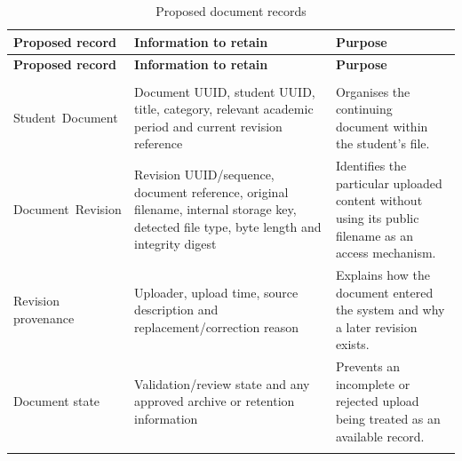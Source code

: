 \begingroup
\singlespacing%
\setlength{\tabcolsep}{4pt}
\begin{longtable}{@{}>{\RaggedRight\arraybackslash}p{}>{\RaggedRight\arraybackslash}p{}>{\RaggedRight\arraybackslash}p{}@{}}
\caption{Proposed document records}\label{tab:3-4}\\
\toprule
\textbf{Proposed record} & \textbf{Information to retain} & \textbf{Purpose} \\
\midrule
\endfirsthead%
\toprule
\textbf{Proposed record} & \textbf{Information to retain} & \textbf{Purpose} \\
\midrule
\endhead%
\midrule
\multicolumn{3}{r}{Continued on next page}\\
\endfoot%
\bottomrule
\endlastfoot%
Student\allowbreak~Document & Document UUID, student UUID, title, category, relevant academic period and current revision reference & Organises the continuing document within the student's file. \\ \addlinespace
Document\allowbreak~Revision & Revision UUID/sequence, document reference, original filename, internal storage key, detected file type, byte length and integrity digest & Identifies the particular uploaded content without using its public filename as an access mechanism. \\ \addlinespace
Revision provenance & Uploader, upload time, source description and replacement/correction reason & Explains how the document entered the system and why a later revision exists. \\ \addlinespace
Document state & Validation/review state and any approved archive or retention information & Prevents an incomplete or rejected upload being treated as an available record. \\ \addlinespace
\end{longtable}
\endgroup
